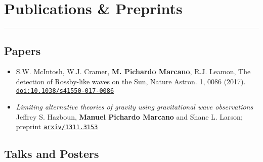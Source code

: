 \documentclass[letterpaper,10pt]{article}
\begin{document}
\section*{Publications \& Preprints}
\hrule
\vspace{.3 cm}
\subsection*{Papers}
\begin{itemize}[label=$\blacktriangleright$]

\item  S.W. McIntosh, W.J. Cramer, \textbf{M. Pichardo Marcano}, R.J. Leamon, The detection of Rossby-like waves on the Sun, Nature Astron. 1, 0086 (2017). \href{http://dx.doi.org/10.1038/s41550-017-0086}{\tt doi:10.1038/s41550-017-0086} \\


\item  \emph{Limiting alternative theories of gravity using gravitational wave observations} \\
Jeffrey S. Hazboun, \textbf{Manuel Pichardo Marcano} and Shane L. Larson; preprint \href{http://arxiv.org/abs/1311.3153}{\tt arxiv/1311.3153} \\


\end{itemize}

\subsection*{Talks and Posters}
\end{document}
